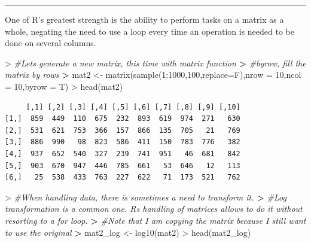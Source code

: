 \documentclass[
]{book}
\newenvironment{Shaded}{\begin{snugshade}}{\end{snugshade}}
\newcommand{\AttributeTok}[1]{\textcolor[rgb]{0.77,0.63,0.00}{#1}}
\newcommand{\CommentTok}[1]{\textcolor[rgb]{0.56,0.35,0.01}{\textit{#1}}}
\newcommand{\DecValTok}[1]{\textcolor[rgb]{0.00,0.00,0.81}{#1}}
\newcommand{\ErrorTok}[1]{\textcolor[rgb]{0.64,0.00,0.00}{\textbf{#1}}}
\newcommand{\FunctionTok}[1]{\textcolor[rgb]{0.00,0.00,0.00}{#1}}
\newcommand{\NormalTok}[1]{#1}
\newcommand{\OtherTok}[1]{\textcolor[rgb]{0.56,0.35,0.01}{#1}}
\newcommand{\SpecialCharTok}[1]{\textcolor[rgb]{0.00,0.00,0.00}{#1}}
\theoremstyle{definition}
\theoremstyle{definition}
\theoremstyle{definition}
\theoremstyle{definition}
\theoremstyle{remark}
\begin{document}
\begin{center}\rule{0.5\linewidth}{0.5pt}\end{center}

One of R's greatest strength is the ability to perform tasks on a matrix as a whole, negating the need to use a loop
every time an operation is needed to be done on several columns.

\begin{Shaded}
\begin{Highlighting}[]
\SpecialCharTok{\textgreater{}} \CommentTok{\#Let\textquotesingle{}s generate a new matrix, this time with matrix function}
\ErrorTok{\textgreater{}} \CommentTok{\#byrow, fill the matrix by rows}
\ErrorTok{\textgreater{}}\NormalTok{ mat2 }\OtherTok{\textless{}{-}} \FunctionTok{matrix}\NormalTok{(}\FunctionTok{sample}\NormalTok{(}\DecValTok{1}\SpecialCharTok{:}\DecValTok{1000}\NormalTok{,}\DecValTok{100}\NormalTok{,}\AttributeTok{replace=}\NormalTok{F),}\AttributeTok{nrow =} \DecValTok{10}\NormalTok{,}\AttributeTok{ncol =} \DecValTok{10}\NormalTok{,}\AttributeTok{byrow =}\NormalTok{ T)}
\SpecialCharTok{\textgreater{}} \FunctionTok{head}\NormalTok{(mat2)}
\end{Highlighting}
\end{Shaded}

\begin{verbatim}
     [,1] [,2] [,3] [,4] [,5] [,6] [,7] [,8] [,9] [,10]
[1,]  859  449  110  675  232  893  619  974  271   630
[2,]  531  621  753  366  157  866  135  705   21   769
[3,]  886  990   98  823  586  411  150  783  776   382
[4,]  937  652  540  327  239  741  951   46  681   842
[5,]  903  670  947  446  785  661   53  646   12   113
[6,]   25  538  433  763  227  622   71  173  521   762
\end{verbatim}

\begin{Shaded}
\begin{Highlighting}[]
\SpecialCharTok{\textgreater{}} \CommentTok{\#When handling data, there is sometimes a need to transform it.}
\ErrorTok{\textgreater{}} \CommentTok{\#Log transformation is a common one. R\textquotesingle{}s handling of matrices allows to do it without resorting to a for loop.}
\ErrorTok{\textgreater{}} \CommentTok{\#Note that I am copying the matrix because I still want to use the original}
\ErrorTok{\textgreater{}}\NormalTok{ mat2\_log }\OtherTok{\textless{}{-}} \FunctionTok{log10}\NormalTok{(mat2)}
\SpecialCharTok{\textgreater{}} \FunctionTok{head}\NormalTok{(mat2\_log)}
\end{Highlighting}
\end{Shaded}
\end{document}
